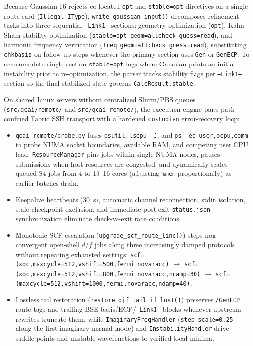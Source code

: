 \documentclass[journal=jctcce,manuscript=article]{achemso}
\begin{document}
Because Gaussian 16 rejects co-located \texttt{opt} and \texttt{stable=opt} directives on a single route card (\texttt{Illegal IType}), \texttt{write\_gaussian\_input()} decomposes refinement tasks into three sequential \texttt{--Link1--} sections: geometry optimization (\texttt{opt}), Kohn--Sham stability optimization (\texttt{stable=opt geom=allcheck guess=read}), and harmonic frequency verification (\texttt{freq geom=allcheck guess=read}), substituting \texttt{chkbasis} on follow-up steps whenever the primary section uses \texttt{Gen} or \texttt{GenECP}. To accommodate single-section \texttt{stable=opt} logs where Gaussian prints an initial instability prior to re-optimization, the parser tracks stability flags per \texttt{--Link1--} section so the final stabilized state governs \texttt{CalcResult.stable}.

On shared Linux servers without centralized Slurm/PBS queues (\texttt{src/qcai/remote/} and \texttt{src/qcai\_remote/}), the execution engine pairs path-confined Fabric SSH transport with a hardened \texttt{custodian} error-recovery loop:
\begin{itemize}
  \item \texttt{qcai\_remote/probe.py} fuses \texttt{psutil}, \texttt{lscpu -J}, and \texttt{ps -eo user,pcpu,comm} to probe NUMA socket boundaries, available RAM, and competing user CPU load. \texttt{ResourceManager} pins jobs within single NUMA nodes, pauses submissions when host resources are congested, and dynamically scales queued S4 jobs from 4 to 10--16 cores (adjusting \texttt{\%mem} proportionally) as earlier batches drain.
  \item Keepalive heartbeats (30~s), automatic channel reconnection, stdin isolation, stale-checkpoint exclusion, and immediate post-exit \texttt{status.json} synchronization eliminate check-vs-exit race conditions.
  \item Monotonic SCF escalation (\texttt{upgrade\_scf\_route\_line()}) steps non-convergent open-shell $d$/$f$ jobs along three increasingly damped protocols without repeating exhausted settings: \texttt{scf=(xqc,maxcycle=512,vshift=500,fermi,novaracc)} $\rightarrow$ \texttt{scf=(xqc,maxcycle=512,vshift=800,fermi,novaracc,ndamp=30)} $\rightarrow$ \texttt{scf=(maxcycle=512,vshift=1000,fermi,novaracc,ndamp=40)}.
  \item Lossless tail restoration (\texttt{restore\_gjf\_tail\_if\_lost()}) preserves \texttt{/GenECP} route tags and trailing BSE basis/ECP/\texttt{--Link1--} blocks whenever upstream rewrites truncate them, while \texttt{ImaginaryFreqHandler} (\texttt{step\_scale=0.25} along the first imaginary normal mode) and \texttt{InstabilityHandler} drive saddle points and unstable wavefunctions to verified local minima.
\end{itemize}
\end{document}
